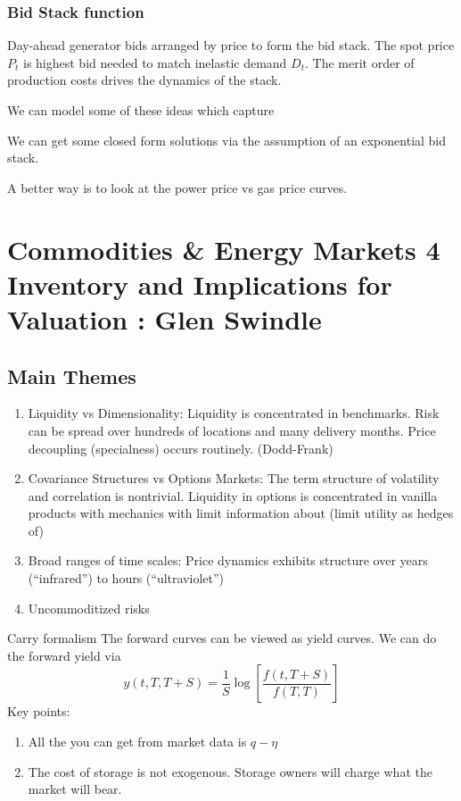 \subsection{Bid Stack function}
Day-ahead generator bids arranged by price to form the bid stack. The spot price $P_t$ is highest bid needed to match inelastic demand $D_t$. The merit order of production costs drives the dynamics of the stack.

We can model some of these ideas which capture

We can get some closed form solutions via the assumption of an exponential bid stack.

A better way is to look at the power price vs gas price curves.

\chapter{Commodities \& Energy Markets 4 \\ Inventory and Implications for Valuation : Glen Swindle}
\section{Main Themes}
\begin{enumerate}
	\item Liquidity vs Dimensionality: Liquidity is concentrated in benchmarks. Risk can be spread over hundreds of locations and many delivery months. Price decoupling (specialness) occurs routinely. (Dodd-Frank)
	
	\item Covariance Structures vs Options Markets: The term structure of volatility and correlation is nontrivial. Liquidity in options is concentrated in vanilla products with mechanics with limit information about (limit utility as hedges of)
	
	\item Broad ranges of time scales: Price dynamics exhibits structure over years (``infrared'') to hours (``ultraviolet'')
	
	\item Uncommoditized risks
\end{enumerate}

Carry formalism
The forward curves can be viewed as yield curves. We can do the forward yield via
\begin{equation}
	y(t,T,T+S) = \frac{1}{S} \log \left[ \frac{f(t,T+S)}{f(T,T)}\right]
\end{equation}
Key points:
\begin{enumerate}
	\item All the you can get from market data is $q-\eta$
	\item The cost of storage is not exogenous. Storage owners will charge what the market will bear.
\end{enumerate}

